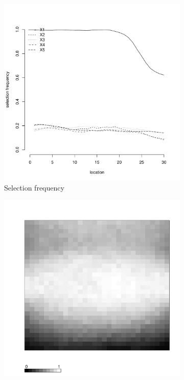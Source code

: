 \documentclass[authoryear, review, 11pt]{elsarticle}
\begin{document}
\begin{figure}
\begin{subfigure}[b]{0.45\textwidth}
		\includegraphics[width=\textwidth]{../../figures/simulation/15.2.profile_selection.pdf}
		\caption{Selection frequency}
	\end{subfigure}
	\begin{subfigure}[b]{0.45\textwidth}
	\centering
		\includegraphics[width=\textwidth]{../../figures/simulation/X1.15.2.unshrunk_bootstrap_coverage.pdf}

\end{subfigure}
\end{figure}
\end{document}
